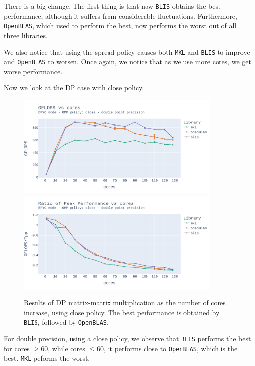 \documentclass{report}
\begin{document}
There is a big change. The first thing is that now \texttt{BLIS} obtains the best 
performance, although it suffers from considerable fluctuations. Furthermore, 
\texttt{OpenBLAS}, which used to perform the best, now performs the worst out of 
all three libraries.

We also notice that using the spread policy causes both \texttt{MKL} and \texttt{BLIS}
to improve and \texttt{OpenBLAS} to worsen. Once again, we notice that as we use more cores, we get worse performance.

Now we look at the DP case with close policy.

\begin{figure}[H]
\hspace*{-2.5cm}
\includegraphics[width=10cm, height=5cm]{./images/fixed_size_epyc_double_gflops_close.pdf}
\includegraphics[width=10cm, height=5cm]{./images/fixed_size_epyc_double_gflops_close_ratio.pdf}
\caption{\label{fig:fixed_size_epyc_double_close} Results of DP matrix-matrix multiplication 
as the number of cores increase, using close policy. The best performance is 
obtained by \texttt{BLIS}, followed by \texttt{OpenBLAS}.}
\end{figure}

For double precision, using a close policy, we observe that \texttt{BLIS} 
performs the best for cores $\geq 60$, while cores $\leq60$, it performs close 
to \texttt{OpenBLAS}, which is the best. \texttt{MKL} peforms the worst.
\\
\end{document}
